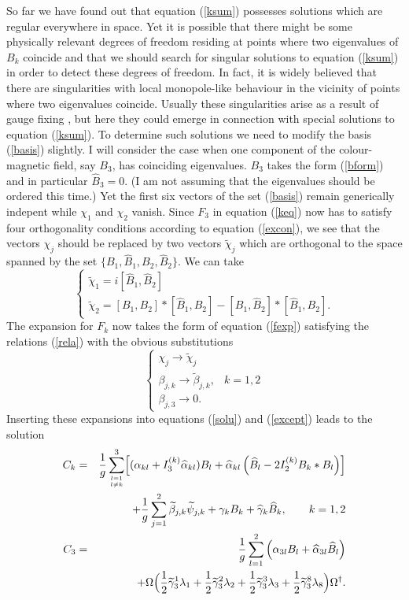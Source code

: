 \documentclass[a4paper,12pt]{article}
\begin{document}
So far we have found out that equation (\ref{ksum}) possesses solutions which are regular everywhere in space. Yet it is possible that there might be some physically relevant degrees of freedom residing at points where two eigenvalues of $B_k$ coincide and that we should search for singular solutions to equation (\ref{ksum}) in order to detect these degrees of freedom. In fact, it is widely believed that there are singularities with local monopole-like behaviour in the vicinity of points where two eigenvalues coincide. Usually these singularities arise as a result of gauge fixing \cite{th}, but here they could emerge in connection with special solutions to equation (\ref{ksum}). To determine such solutions we need to modify the basis (\ref{basis}) slightly. I will consider the case when one component of the colour-magnetic field, say $B_3$, has coinciding eigenvalues. $B_3$ takes the form (\ref{bform}) and in particular $\widehat{B}_3 = 0$. (I am not assuming that the eigenvalues should be ordered this time.) Yet the first six vectors of the set (\ref{basis}) remain generically indepent while $\chi_1$ and $\chi_2$ vanish. Since $F_3$ in equation (\ref{keq}) now has to satisfy four orthogonality conditions according to equation (\ref{excon}), we see that the vectors $\chi_j$ should be replaced by two vectors $\widetilde{\chi}_j$ which are orthogonal to the space spanned by the set $\{ B_1, \widehat{B}_1, B_2, \widehat{B}_2 \}$. We can take
$$ \left\{ \begin{array}{l} 
\widetilde{\chi}_1 = i[\widehat{B}_1,\widehat{B}_2] \\
\widetilde{\chi}_2 = [B_1,B_2]*[\widehat{B}_1,\widehat{B}_2] - [B_1,\widehat{B}_2]*[\widehat{B}_1,B_2].
\end{array} \right. $$
The expansion for $F_k$ now takes the form of equation (\ref{fexp}) satisfying the relations (\ref{rela}) with the obvious substitutions 
$$ \left\{ \begin{array}{ll} \chi_j \rightarrow \widetilde{\chi}_j &\\
\beta_{j,k} \rightarrow \widetilde{\beta}_{j,k}, & k=1,2 \\
\beta_{j,3} \rightarrow 0. & \end{array} \right. $$ 
Inserting these expansions into equations (\ref{solu}) and (\ref{except}) leads to the solution 
\begin{eqnarray}\label{excres}
C_k &=& \frac{1}{g} \sum_{l=1 \atop l \neq k}^3 \Bigl[ (\alpha_{kl} + I_3^{(k)} \widehat{\alpha}_{kl}) B_l + \widehat{\alpha}_{kl} \left( \widehat{B}_l - 2 I_2^{(k)} B_k * B_l \right) \Bigr] \nonumber \\*
&& + \frac{1}{g} \sum_{j=1}^2 \widetilde{\beta}_{j,k} \widetilde{\psi}_{j,k} + \gamma_k B_k + \widehat{\gamma}_k \widehat{B}_k, \qquad k = 1,2 \nonumber \\
C_3 &=& \frac{1}{g} \sum_{l=1}^2  \left( \alpha_{3l} B_l + \widehat{\alpha}_{3l} \widehat{B}_l \right) \\*
&& + \Omega \Bigl( \frac{1}{2} \widetilde{\gamma}_3^1 \lambda_1 + \frac{1}{2} \widetilde{\gamma}_3^2 \lambda_2 + \frac{1}{2} \widetilde{\gamma}_3^3 \lambda_3 + \frac{1}{2} \widetilde{\gamma}_3^8 \lambda_8 \Bigr) \Omega^{\dagger}. \nonumber
\end{eqnarray}
\end{document}
